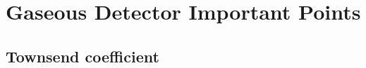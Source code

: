 \chapter{Gaseous Detector Important Points} %
\label{cha:gaseous_detector_important_points}

\section{Townsend coefficient} %
\label{sec:townsend_coefficient}

